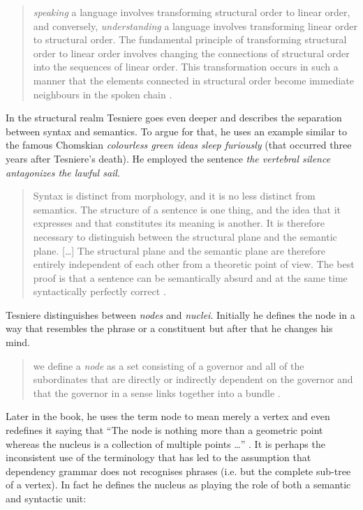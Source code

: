     \begin{quotation}
        \textit{speaking} a language involves transforming structural order to linear order, and conversely, \textit{understanding} a language involves transforming linear order to structural order. The fundamental principle of transforming structural order to linear order involves changing the connections of structural order into the sequences of linear order. This transformation occurs in such a manner that the elements connected in structural order become immediate neighbours in the spoken chain \citep[12]{Tesniere2015}.
    \end{quotation}

    In the structural realm Tesniere goes even deeper and describes the separation between syntax and semantics. To argue for that, he uses an example similar to the famous Chomskian \textit{colourless green ideas sleep furiously} \citep{Chomsky57} (that occurred three years after Tesniere's death). He employed the sentence \textit{the vertebral silence antagonizes the lawful sail}.
    
    \begin{quotation}
        Syntax is distinct from morphology, and it is no less distinct from semantics. The structure of a sentence is one thing, and the idea that it expresses and that constitutes its meaning is another. It is therefore necessary to distinguish between the structural plane and the semantic plane.
        [\dots]
        The structural plane and the semantic plane are therefore entirely independent of each other from a theoretic point of view. The best proof is that a sentence can be ­semantically absurd and at the same time syntactically perfectly correct \citep[33]{Tesniere2015}.
    \end{quotation}

    Tesniere distinguishes between \textit{nodes} and \textit{nuclei}. Initially he defines the node in a way that resembles the phrase or a constituent but after that he changes his mind.  
    
    \begin{quotation}
        we define a \textit{node} as a set consisting of a governor and all of the subordinates that are directly or indirectly dependent on the governor and that the governor in a sense links together into a bundle \citep[6]{Tesniere2015}.
    \end{quotation}

    Later in the book, he uses the term node to mean merely a vertex and even redefines it saying that ``The node is nothing more than a geometric point whereas the nucleus is a collection of multiple points \dots'' \cite[39]{Tesniere2015}. It is perhaps the inconsistent use of the terminology that has led to the assumption that dependency grammar does not recognises phrases (i.e. but the complete sub-tree of a vertex). In fact he defines the nucleus as playing the role of both a semantic and syntactic unit:


